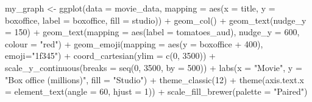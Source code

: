 \documentclass[
]{krantz}
\makeatletter
\newenvironment{Shaded}{\begin{snugshade}}{\end{snugshade}}
\newcommand{\AttributeTok}[1]{\textcolor[rgb]{0.61,0.61,0.61}{#1}}
\newcommand{\DecValTok}[1]{\textcolor[rgb]{0.06,0.06,0.06}{#1}}
\newcommand{\FunctionTok}[1]{\textcolor[rgb]{0,0,0}{#1}}
\newcommand{\NormalTok}[1]{#1}
\newcommand{\OtherTok}[1]{\textcolor[rgb]{0.37,0.37,0.37}{#1}}
\newcommand{\SpecialCharTok}[1]{\textcolor[rgb]{0,0,0}{#1}}
\newcommand{\StringTok}[1]{\textcolor[rgb]{0.5,0.5,0.5}{#1}}
\newenvironment{kframe}{%
\medskip{}
\setlength{\fboxsep}{.8em}
 \def\at@end@of@kframe{}%
 \ifinner\ifhmode%
  \def\at@end@of@kframe{\end{minipage}}%
  \begin{minipage}{\columnwidth}%
 \fi\fi%
 \def\FrameCommand##1{\hskip\@totalleftmargin \hskip-\fboxsep
 \colorbox{shadecolor}{##1}\hskip-\fboxsep
     \hskip-\linewidth \hskip-\@totalleftmargin \hskip\columnwidth}%
 \MakeFramed {\advance\hsize-\width
   \@totalleftmargin\z@ \linewidth\hsize
   \@setminipage}}%
 {\par\unskip\endMakeFramed%
 \at@end@of@kframe}
\renewenvironment{Shaded}{\begin{kframe}}{\end{kframe}}
\makeatother
\begin{document}
\begin{Shaded}
\begin{Highlighting}[]
\NormalTok{my\_graph }\OtherTok{\textless{}{-}} \FunctionTok{ggplot}\NormalTok{(}\AttributeTok{data =}\NormalTok{ movie\_data,}
           \AttributeTok{mapping =} \FunctionTok{aes}\NormalTok{(}\AttributeTok{x =}\NormalTok{ title,}
                         \AttributeTok{y =}\NormalTok{ boxoffice,}
                         \AttributeTok{label =}\NormalTok{ boxoffice, }
                         \AttributeTok{fill =}\NormalTok{ studio)) }\SpecialCharTok{+}
  \FunctionTok{geom\_col}\NormalTok{() }\SpecialCharTok{+}
  \FunctionTok{geom\_text}\NormalTok{(}\AttributeTok{nudge\_y =} \DecValTok{150}\NormalTok{)  }\SpecialCharTok{+}
  \FunctionTok{geom\_text}\NormalTok{(}\AttributeTok{mapping =} \FunctionTok{aes}\NormalTok{(}\AttributeTok{label =}\NormalTok{ tomatoes\_aud), }
            \AttributeTok{nudge\_y =} \DecValTok{600}\NormalTok{, }
            \AttributeTok{colour =} \StringTok{"red"}\NormalTok{) }\SpecialCharTok{+}
  \FunctionTok{geom\_emoji}\NormalTok{(}\AttributeTok{mapping =} \FunctionTok{aes}\NormalTok{(}\AttributeTok{y =}\NormalTok{ boxoffice }\SpecialCharTok{+} \DecValTok{400}\NormalTok{),}
             \AttributeTok{emoji=}\StringTok{"1f345"}\NormalTok{) }\SpecialCharTok{+}
  \FunctionTok{coord\_cartesian}\NormalTok{(}\AttributeTok{ylim =} \FunctionTok{c}\NormalTok{(}\DecValTok{0}\NormalTok{, }\DecValTok{3500}\NormalTok{)) }\SpecialCharTok{+}
  \FunctionTok{scale\_y\_continuous}\NormalTok{(}\AttributeTok{breaks =} \FunctionTok{seq}\NormalTok{(}\DecValTok{0}\NormalTok{, }\DecValTok{3500}\NormalTok{, }\AttributeTok{by =} \DecValTok{500}\NormalTok{)) }\SpecialCharTok{+}
  \FunctionTok{labs}\NormalTok{(}\AttributeTok{x =} \StringTok{"Movie"}\NormalTok{,}
       \AttributeTok{y =} \StringTok{"Box office (millions)"}\NormalTok{,}
       \AttributeTok{fill =} \StringTok{"Studio"}\NormalTok{) }\SpecialCharTok{+}
  \FunctionTok{theme\_classic}\NormalTok{(}\DecValTok{12}\NormalTok{) }\SpecialCharTok{+}
  \FunctionTok{theme}\NormalTok{(}\AttributeTok{axis.text.x =} \FunctionTok{element\_text}\NormalTok{(}\AttributeTok{angle =} \DecValTok{60}\NormalTok{, }
                                   \AttributeTok{hjust =} \DecValTok{1}\NormalTok{)) }\SpecialCharTok{+}
  \FunctionTok{scale\_fill\_brewer}\NormalTok{(}\AttributeTok{palette =} \StringTok{"Paired"}\NormalTok{)}
\end{Highlighting}
\end{Shaded}
\end{document}
